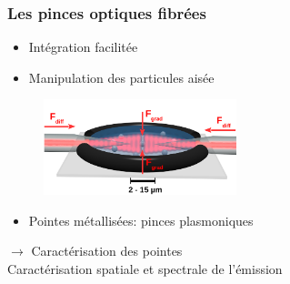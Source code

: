 \documentclass[9pt,a9paper,handout]{beamer}
\begin{document}
    \begin{frame}
        \frametitle{Les pinces optiques fibrées}

        \begin{itemize}
            \item Intégration facilitée
            \vspace*{1mm}
            \item Manipulation des particules aisée
        \end{itemize}
        \vspace*{-5mm}
        \begin{figure}[H]
            \includegraphics[width=0.5\textwidth]{Images/Schemas/piegeage_deuxpointes}
        \end{figure}
        \begin{itemize} \item Pointes métallisées: pinces plasmoniques
        \end{itemize}

    \vspace*{5mm}
        {\large $\rightarrow$ Caractérisation des pointes} \vspace*{1mm}\\
        \qquad Caractérisation spatiale et spectrale de l'émission
    \end{frame}
\end{document}
